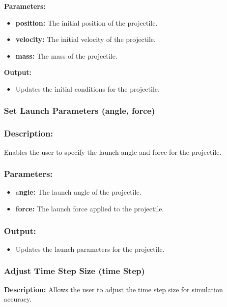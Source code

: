 \documentclass[12pt, titlepage]{article}
\begin{document}
\textbf{Parameters:}
\begin{itemize}
  \item \textbf{position:} The initial position of the projectile.
  \item \textbf{velocity:} The initial velocity of the projectile.
  \item \textbf{mass:} The mass of the projectile.
\end{itemize}

\textbf{Output:}
\begin{itemize}
  \item Updates the initial conditions for the projectile.
\end{itemize}

\subsubsection*{Set Launch Parameters (angle, force)}

\subsubsection*{Description: }Enables the user to specify the launch angle and force for the projectile.

\subsubsection*{Parameters:}
\begin{itemize}
  \item a\textbf{ngle:} The launch angle of the projectile.
  \item \textbf{force:} The launch force applied to the projectile.
\end{itemize}

\subsubsection*{Output:}
\begin{itemize}
  \item Updates the launch parameters for the projectile.
\end{itemize}

\subsubsection*{Adjust Time Step Size (time Step)}

\textbf{Description:} Allows the user to adjust the time step size for simulation accuracy.
\end{document}
